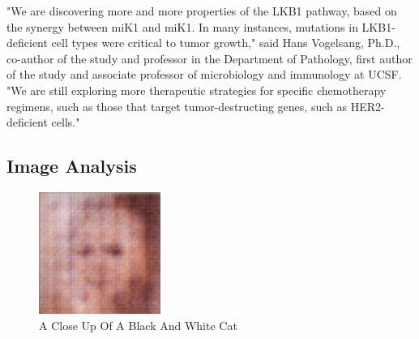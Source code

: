 \documentclass{article}%
\begin{document}
"We are discovering more and more properties of the LKB1 pathway, based on the synergy between miK1 and miK1. In many instances, mutations in LKB1{-}deficient cell types were critical to tumor growth," said Hans Vogelsang, Ph.D., co{-}author of the study and professor in the Department of Pathology, first author of the study and associate professor of microbiology and immunology at UCSF. "We are still exploring more therapeutic strategies for specific chemotherapy regimens, such as those that target tumor{-}destructing genes, such as HER2{-}deficient cells."

%
\subsection{Image Analysis}%
\label{subsec:ImageAnalysis}%


\begin{figure}[h!]%
\centering%
\includegraphics[width=150px]{500_fake_images/samples_5_407.png}%
\caption{A Close Up Of A Black And White Cat}%
\end{figure}

%
\end{document}
